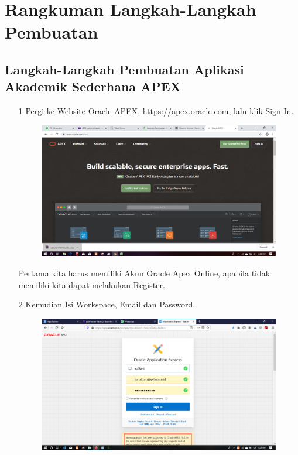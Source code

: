\chapter{Rangkuman Langkah-Langkah Pembuatan}

\section{Langkah-Langkah Pembuatan Aplikasi Akademik Sederhana APEX}

\begin{enumerate}


\item[1]Pergi ke Website Oracle APEX, https://apex.oracle.com, lalu klik Sign In.

\begin{figure}[!htbp]
    \begin{center}
    \includegraphics[scale=0.2]{figures/01.png}
    \end{center}
    \end{figure}

\par
Pertama kita harus memiliki Akun Oracle Apex Online, apabila tidak memiliki kita dapat melakukan Register.

\item[2]Kemudian Isi Workspace, Email dan Password.

\begin{figure}[!htbp]
    \begin{center}
    \includegraphics[scale=0.2]{figures/31.png}
    \end{center}   
    \end{figure}


\end{enumerate}
